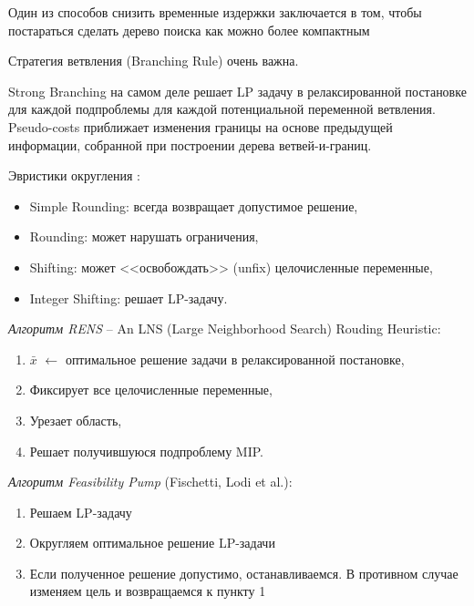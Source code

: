 \documentclass[%
	11pt,
	a4paper,
	utf8,
		]{article}
\begin{document}
Один из способов снизить временные издержки заключается в том, чтобы постараться сделать дерево поиска как можно более компактным

Стратегия ветвления (Branching Rule) очень важна.

Strong Branching на самом деле решает LP задачу в релаксированной постановке для каждой подпроблемы для каждой потенциальной переменной ветвления. Pseudo-costs приближает изменения границы на основе предыдущей информации, собранной при построении дерева ветвей-и-границ.

Эвристики округления \cite{berthold:primal_heur_scip}:
\begin{itemize}
	\item Simple Rounding: всегда возвращает допустимое решение,
	
	\item Rounding: может нарушать ограничения,
	
	\item Shifting: может <<освобождать>> (unfix) целочисленные переменные,
	
	\item Integer Shifting: решает LP-задачу.
\end{itemize}

\emph{Алгоритм RENS} -- An LNS (Large Neighborhood Search) Rouding Heuristic:
\begin{enumerate}
	\item $ \bar{x} $ $\leftarrow$ оптимальное решение задачи в релаксированной постановке,
	
	\item Фиксирует все целочисленные переменные,
	
	\item Урезает область,
	
	\item Решает получившуюся подпроблему MIP.
\end{enumerate}

\emph{Алгоритм Feasibility Pump} (Fischetti, Lodi et al.):
\begin{enumerate}
	\item Решаем LP-задачу
	
	\item Округляем оптимальное решение LP-задачи
	
	\item Если полученное решение допустимо, останавливаемся. В противном случае изменяем цель и возвращаемся к пункту 1
\end{enumerate}
\end{document}
